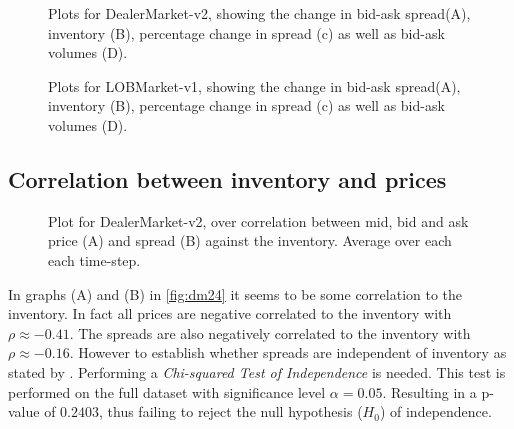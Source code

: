 \documentclass{kththesis}
\theoremstyle{definition}
\begin{document}
\begin{figure}
	    	\centering
		
		\caption{Plots for DealerMarket-v2, showing the change in bid-ask spread(A), inventory (B), percentage change in spread (c) as well as bid-ask volumes (D).}
		\label{fig:dm22}
\end{figure}

\begin{figure}
	    	\centering
		
		\caption{Plots for LOBMarket-v1, showing the change in bid-ask spread(A), inventory (B), percentage change in spread (c) as well as bid-ask volumes (D).}
		\label{fig:dm32}
\end{figure}


\newpage
\subsection*{Correlation between inventory and prices}

\begin{figure}[H]
	    	\centering
		
		\caption{Plot for DealerMarket-v2, over correlation between mid, bid and ask price (A) and spread (B) against the inventory. Average over each each time-step.}
		\label{fig:dm24}
\end{figure}
In graphs (A) and (B) in \autoref{fig:dm24} it seems to be some correlation to the inventory. In fact all prices are negative correlated to the inventory with $\rho \approx -0.41$. The spreads are also negatively correlated to the inventory with $\rho\approx - 0.16$. However to establish whether spreads are independent of inventory as stated by \textcite{ho1981optimal}. Performing a \textit{Chi-squared Test of Independence} is needed. This test is performed on the full dataset with significance level $\alpha = 0.05$. Resulting in a p-value of $0.2403$, thus failing to reject the null hypothesis ($H_{0}$) of independence. 
\end{document}
